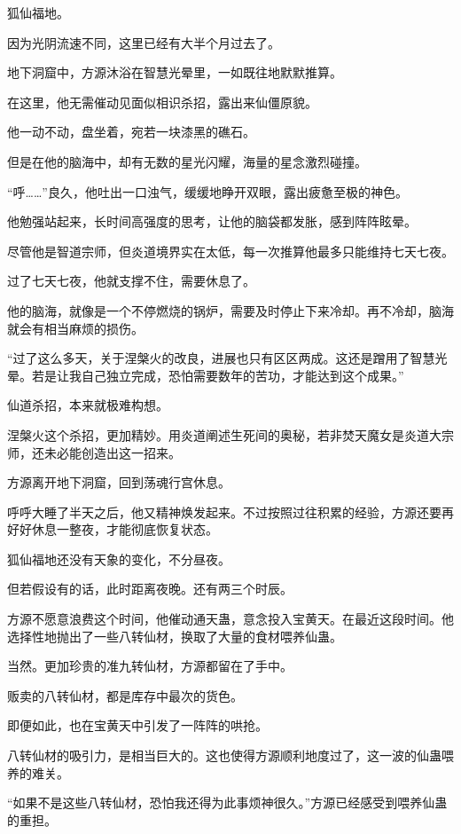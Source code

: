 
\begin{this_body}

狐仙福地。

因为光阴流速不同，这里已经有大半个月过去了。

地下洞窟中，方源沐浴在智慧光晕里，一如既往地默默推算。

在这里，他无需催动见面似相识杀招，露出来仙僵原貌。

他一动不动，盘坐着，宛若一块漆黑的礁石。

但是在他的脑海中，却有无数的星光闪耀，海量的星念激烈碰撞。

“呼……”良久，他吐出一口浊气，缓缓地睁开双眼，露出疲惫至极的神色。

他勉强站起来，长时间高强度的思考，让他的脑袋都发胀，感到阵阵眩晕。

尽管他是智道宗师，但炎道境界实在太低，每一次推算他最多只能维持七天七夜。

过了七天七夜，他就支撑不住，需要休息了。

他的脑海，就像是一个不停燃烧的锅炉，需要及时停止下来冷却。再不冷却，脑海就会有相当麻烦的损伤。

“过了这么多天，关于涅槃火的改良，进展也只有区区两成。这还是蹭用了智慧光晕。若是让我自己独立完成，恐怕需要数年的苦功，才能达到这个成果。”

仙道杀招，本来就极难构想。

涅槃火这个杀招，更加精妙。用炎道阐述生死间的奥秘，若非焚天魔女是炎道大宗师，还未必能创造出这一招来。

方源离开地下洞窟，回到荡魂行宫休息。

呼呼大睡了半天之后，他又精神焕发起来。不过按照过往积累的经验，方源还要再好好休息一整夜，才能彻底恢复状态。

狐仙福地还没有天象的变化，不分昼夜。

但若假设有的话，此时距离夜晚。还有两三个时辰。

方源不愿意浪费这个时间，他催动通天蛊，意念投入宝黄天。在最近这段时间。他选择性地抛出了一些八转仙材，换取了大量的食材喂养仙蛊。

当然。更加珍贵的准九转仙材，方源都留在了手中。

贩卖的八转仙材，都是库存中最次的货色。

即便如此，也在宝黄天中引发了一阵阵的哄抢。

八转仙材的吸引力，是相当巨大的。这也使得方源顺利地度过了，这一波的仙蛊喂养的难关。

“如果不是这些八转仙材，恐怕我还得为此事烦神很久。”方源已经感受到喂养仙蛊的重担。


\end{this_body}
